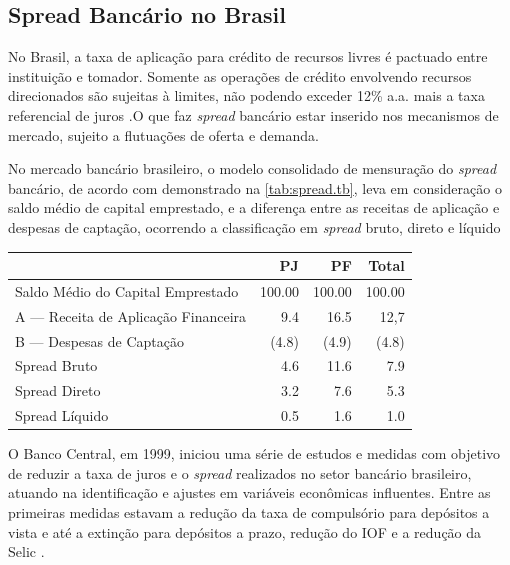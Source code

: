 \documentclass[12pt,12pt,openright,oneside,a4paper,chapter=TITLE,section=TITLE,subsection=TITLE,subsubsection=TITLE,english,french,spanish,portugues,sumario=tradicional]{abntex2}
\begin{document}
\subsection{Spread Bancário no Brasil}

No Brasil, a taxa de aplicação para crédito de recursos livres é pactuado entre
instituição e tomador. Somente as operações de crédito envolvendo recursos
direcionados são sujeitas à limites, não podendo exceder 12\% a.a. mais a taxa
referencial de juros \cite{BCB:2016}.O que faz \emph{spread} bancário estar inserido nos mecanismos de mercado, sujeito a flutuações de oferta e demanda.

No mercado bancário brasileiro, o modelo consolidado de mensuração do \emph{spread} bancário, de acordo com demonstrado na \autoref{tab:spread.tb}, leva em consideração o saldo médio de capital emprestado, e a diferença entre as receitas de aplicação e despesas de captação, ocorrendo a classificação em \emph{spread} bruto, direto e líquido \cite{fipecafi:2005}

\begin{table}[b]
 \centering
    \label{tab:spread.tb}
     \begin{tabular}{l|r|r|r}
      \hline
                                           &   PJ   &   PF    & Total \\
       \hline
       Saldo Médio do Capital Emprestado   & 100.00 & 100.00  & 100.00 \\
       A — Receita de Aplicação Financeira & 9.4    & 16.5    & 12,7   \\
       B — Despesas de Captação            & (4.8)  & (4.9)   & (4.8)  \\   
       Spread Bruto                        & 4.6    & 11.6    & 7.9    \\
       Spread Direto                       & 3.2    & 7.6     & 5.3    \\
       Spread Líquido                      & 0.5    & 1.6     & 1.0    \\
       \hline
       \end{tabular}
\end{table}

O Banco Central, em 1999, iniciou uma série de estudos e medidas com objetivo
de reduzir a taxa de juros e o \emph{spread} realizados no setor bancário
brasileiro, atuando na identificação e ajustes em variáveis econômicas
influentes. Entre as primeiras medidas estavam a redução da taxa de compulsório
para depósitos a vista e até a extinção para depósitos a prazo, redução do IOF
e a redução da Selic \cite{BCB:2000}.
\end{document}
